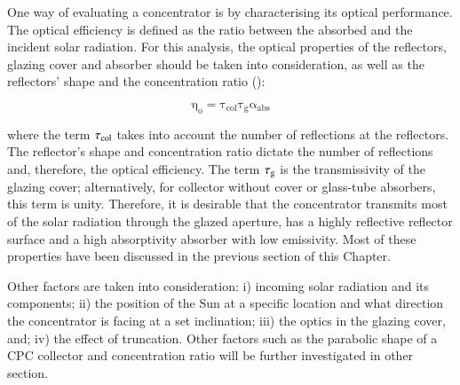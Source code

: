 One way of evaluating a concentrator is by characterising its optical performance. The optical efficiency is defined as the ratio between the absorbed and the incident solar radiation. For this analysis, the optical properties of the reflectors, glazing cover and absorber should be taken into consideration, as well as the reflectors' shape and the concentration ratio (\cite{Sellami2013}):

\begin{equation}
	\mathrm{\eta_o = {\tau_{col}}\tau_{g}\alpha_{abs}}
	\label{optical0}
\end{equation}

\noindent where the term $\rm{\tau_{col}}$ takes into account the number of reflections at the reflectors. The reflector's shape and concentration ratio dictate the number of reflections and, therefore, the optical efficiency. The term $\rm{\tau_{g}}$ is the transmissivity of the glazing cover; alternatively, for collector without cover or glass-tube absorbers, this term is unity. Therefore, it is desirable that the concentrator transmits most of the solar radiation through the glazed aperture, has a highly reflective reflector surface and a high absorptivity absorber with low emissivity. Most of these properties have been discussed in the previous section of this Chapter.

Other factors are taken into consideration: i) incoming solar radiation and its components; ii) the position of the Sun at a specific location and what direction the concentrator is facing at a set inclination; iii) the optics in the glazing cover, and; iv) the effect of truncation. Other factors such as the parabolic shape of a CPC collector and concentration ratio will be further investigated in other section.



